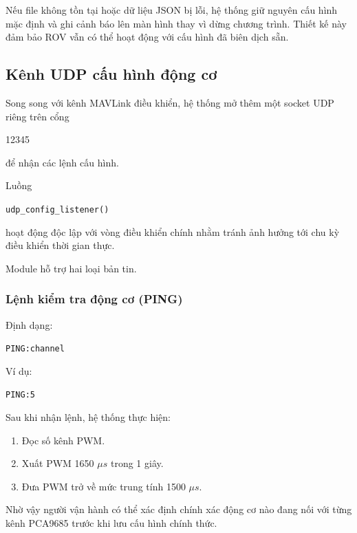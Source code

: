 \documentclass[../DoAn.tex]{subfiles}
\begin{document}
Nếu file không tồn tại hoặc dữ liệu JSON bị lỗi, hệ thống giữ nguyên
cấu hình mặc định và ghi cảnh báo lên màn hình thay vì dừng chương
trình. Thiết kế này đảm bảo ROV vẫn có thể hoạt động với cấu hình
đã biên dịch sẵn.

\subsection{Kênh UDP cấu hình động cơ}

Song song với kênh MAVLink điều khiển, hệ thống mở thêm một socket UDP
riêng trên cổng

\begin{center}
12345
\end{center}

để nhận các lệnh cấu hình.

Luồng

\begin{center}
\texttt{udp\_config\_listener()}
\end{center}

hoạt động độc lập với vòng điều khiển chính nhằm tránh ảnh hưởng tới
chu kỳ điều khiển thời gian thực.

Module hỗ trợ hai loại bản tin.

\subsubsection{Lệnh kiểm tra động cơ (PING)}

Định dạng:

\begin{center}
\texttt{PING:channel}
\end{center}

Ví dụ:

\begin{center}
\texttt{PING:5}
\end{center}

Sau khi nhận lệnh, hệ thống thực hiện:

\begin{enumerate}
    \item Đọc số kênh PWM.
    \item Xuất PWM 1650 $\mu s$ trong 1 giây.
    \item Đưa PWM trở về mức trung tính 1500 $\mu s$.
\end{enumerate}

Nhờ vậy người vận hành có thể xác định chính xác động cơ nào đang nối
với từng kênh PCA9685 trước khi lưu cấu hình chính thức.
\end{document}
